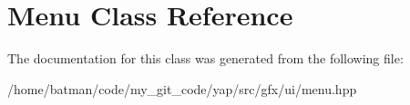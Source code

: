 \hypertarget{classMenu}{}\section{Menu Class Reference}
\label{classMenu}


The documentation for this class was generated from the following file\+:\begin{DoxyCompactItemize}
\item 
/home/batman/code/my\+\_\+git\+\_\+code/yap/src/gfx/ui/menu.\+hpp\end{DoxyCompactItemize}
